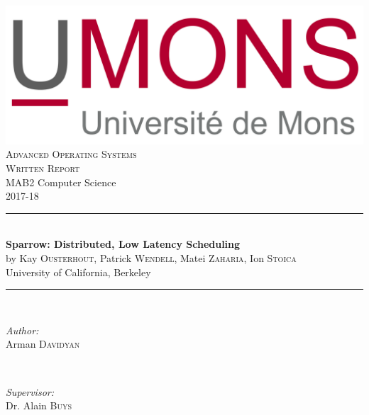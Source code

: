 \documentclass[11pt]{article}
\begin{document}
\begin{titlepage}

\newcommand{\HRule}{\rule{\linewidth}{0.5mm}} %

\center %
 

\includegraphics[scale=.2]{logo.png}\\[1.5cm]
\textsc{\LARGE Advanced Operating Systems}\\[0.5cm]
\textsc{\Large Written Report}\\[0.5cm]
MAB2 Computer Science\\
2017-18


\HRule \\[0.4cm]
{ \huge \bfseries Sparrow: Distributed, Low Latency Scheduling}\\[0.4cm] %
by Kay \textsc{Ousterhout}, Patrick \textsc{Wendell}, Matei \textsc{Zaharia}, Ion \textsc{Stoica}\\
University of California, Berkeley
\HRule \\[1.5cm]
 

\begin{minipage}{0.4\textwidth}
\begin{flushleft} \large
\emph{Author:}\\
Arman \textsc{Davidyan}
\end{flushleft}
\end{minipage}
~
\begin{minipage}{0.4\textwidth}
\begin{flushright} \large
\emph{Supervisor:} \\
Dr. Alain \textsc{Buys}
\end{flushright}
\end{minipage}\\[2cm]


\end{titlepage}
\end{document}
